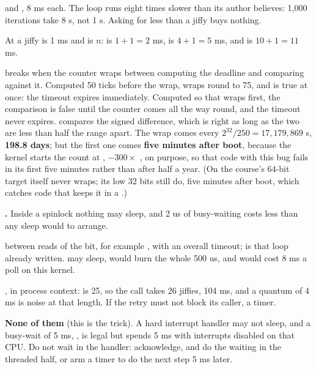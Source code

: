   and , 8 ms each. The loop runs eight times slower than
its author believes: 1,000 iterations take 8 s, not 1 s. Asking for less than a jiffy buys nothing.

 At  a jiffy is 1 ms and  is $n$: 
is $1 + 1 = 2$ ms,  is $4 + 1 = 5$ ms, and  is $10 + 1 = 11$ ms.

 \code{>} breaks when the counter wraps between computing the deadline and comparing
against it. Computed 50 ticks before the wrap,  wraps round to 75, and
 is true at once: the timeout expires immediately. Computed so that
 wraps first, the comparison is false until the counter comes all the way round, and
the timeout never expires.  compares the signed difference, which is right as long
as the two are less than half the range apart. The wrap comes every $2^{32} / 250 = 17{,}179{,}869$
s, \textbf{198.8 days}; but the first one comes \textbf{five minutes after boot}, because the kernel
starts the count at , $-300 \times$ , on purpose, so that code with
this bug fails in its first five minutes rather than after half a year. (On the course's 64-bit
target  itself never wraps; its low 32 bits still do, five minutes after boot, which
catches code that keeps it in a .)


 \textbf{.} Inside a spinlock nothing may sleep, and 2 us of busy-waiting
costs less than any sleep would to arrange.

 \textbf{} between reads of the bit, for example
, with an overall timeout;  is that loop
already written.  may sleep,  would burn the whole 500 us, and
 would cost 8 ms a poll on this kernel.

 \textbf{}, in process context:  is 25, so
the call takes 26 jiffies, 104 ms, and a quantum of 4 ms is noise at that length. If the retry must
not block its caller, a timer.

 \textbf{None of them} (this is the trick). A hard interrupt handler may not sleep, and a
busy-wait of 5 ms, , is legal but spends 5 ms with interrupts disabled on that CPU.
Do not wait in the handler: acknowledge, and do the waiting in the threaded half, or arm a timer to
do the next step 5 ms later.

